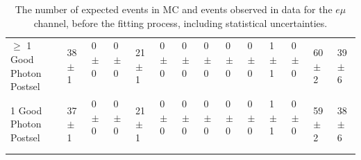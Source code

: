 \begin{table}
{\begin{tabular}{|l|l|l|l|l|l|l|l|l|l|l|l|l|l|}
$\geq$ 1 Good Photon Postsel & 38 $\pm$ 1 \ & 0 $\pm$ 0 \ & 0 $\pm$ 0 \ & 21 $\pm$ 1 \ & 0 $\pm$ 0 \ & 0 $\pm$ 0 \ & 0 $\pm$ 0 \ & 0 $\pm$ 0 \ & 0 $\pm$ 0 \ & 1 $\pm$ 1 \ & 0 $\pm$ 0 \ & 60 $\pm$ 2\ & 39 $\pm$ 6 \\
1 Good Photon Postsel & 37 $\pm$ 1 \ & 0 $\pm$ 0 \ & 0 $\pm$ 0 \ & 21 $\pm$ 1 \ & 0 $\pm$ 0 \ & 0 $\pm$ 0 \ & 0 $\pm$ 0 \ & 0 $\pm$ 0 \ & 0 $\pm$ 0 \ & 1 $\pm$ 1 \ & 0 $\pm$ 0 \ & 59 $\pm$ 2\ & 38 $\pm$ 6 \\
\hline
\end{tabular}
}
\caption{The number of expected events in MC and events observed in data for the $e\mu$ channel, before the fitting process, including statistical uncertainties.}
\label{tab-cutflowEMu}
\end{table}

